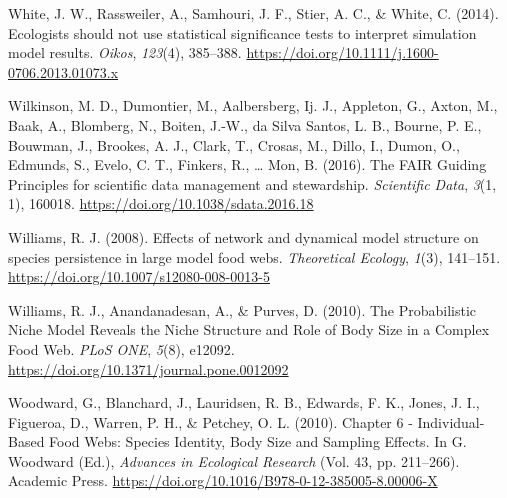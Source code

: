 \documentclass{article}
\newlength{\cslhangindent}
\newlength{\cslentryspacingunit} %
\newenvironment{CSLReferences}[2] %
 {%
  \setlength{\parindent}{0pt}
  \ifodd #1
  \let\oldpar\par
  \def\par{\hangindent=\cslhangindent\oldpar}
  \fi
  \setlength{\parskip}{#2\cslentryspacingunit}
 }%
 {}
\begin{document}
\begin{CSLReferences}{1}{0}
\leavevmode{}%
White, J. W., Rassweiler, A., Samhouri, J. F., Stier, A. C., \& White,
C. (2014). Ecologists should not use statistical significance tests to
interpret simulation model results. \emph{Oikos}, \emph{123}(4),
385--388. \url{https://doi.org/10.1111/j.1600-0706.2013.01073.x}

\leavevmode{}%
Wilkinson, M. D., Dumontier, M., Aalbersberg, Ij. J., Appleton, G.,
Axton, M., Baak, A., Blomberg, N., Boiten, J.-W., da Silva Santos, L.
B., Bourne, P. E., Bouwman, J., Brookes, A. J., Clark, T., Crosas, M.,
Dillo, I., Dumon, O., Edmunds, S., Evelo, C. T., Finkers, R., \ldots{}
Mon, B. (2016). The {FAIR Guiding Principles} for scientific data
management and stewardship. \emph{Scientific Data}, \emph{3}(1, 1),
160018. \url{https://doi.org/10.1038/sdata.2016.18}

\leavevmode{}%
Williams, R. J. (2008). Effects of network and dynamical model structure
on species persistence in large model food webs. \emph{Theoretical
Ecology}, \emph{1}(3), 141--151.
\url{https://doi.org/10.1007/s12080-008-0013-5}

\leavevmode{}%
Williams, R. J., Anandanadesan, A., \& Purves, D. (2010). The
{Probabilistic Niche Model Reveals} the {Niche Structure} and {Role} of
{Body Size} in a {Complex Food Web}. \emph{PLoS ONE}, \emph{5}(8),
e12092. \url{https://doi.org/10.1371/journal.pone.0012092}

\leavevmode{}%
Woodward, G., Blanchard, J., Lauridsen, R. B., Edwards, F. K., Jones, J.
I., Figueroa, D., Warren, P. H., \& Petchey, O. L. (2010). Chapter 6 -
{Individual-Based Food Webs}: {Species Identity}, {Body Size} and
{Sampling Effects}. In G. Woodward (Ed.), \emph{Advances in {Ecological
Research}} (Vol. 43, pp. 211--266). {Academic Press}.
\url{https://doi.org/10.1016/B978-0-12-385005-8.00006-X}

\end{CSLReferences}



\end{document}
